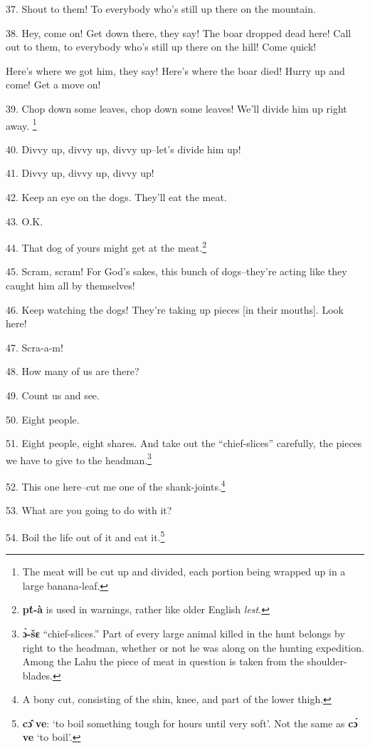 37. Shout to them! To everybody who's still up there on the mountain.

38. Hey, come on! Get down there, they say! The boar dropped dead here! Call out
to them, to everybody who's still up there on the hill! Come quick!

Here's where we got him, they say! Here's where the boar died! Hurry up and come!
Get a move on!

39. Chop down some leaves, chop down some leaves! We'll divide him up right away.
\footnote{The meat will be cut up and divided, each portion being wrapped up in a large banana-leaf.}

40. Divvy up, divvy up, divvy up--let's divide him up!

41. Divvy up, divvy up, divvy up!

42. Keep an eye on the dogs. They'll eat the meat.

43. O.K.


44. That dog of yours might get at the meat.\footnote{\textbf{pt́-à} is used in warnings, rather like older English \textit{lest}.}

45. Scram, scram! For God's sakes, this bunch of dogs--they're acting like they
caught him all by themselves!

46. Keep watching the dogs! They're taking up pieces [in their mouths]. Look here!

47. Scra-a-m!

48. How many of us are there?

49. Count us and see.

50. Eight people.

51. Eight people, eight shares. And take out the ``chief-slices''
carefully, the pieces we have to give to the headman.\footnote{\textbf{ɔ̀-šɛ} ``chief-slices.'' Part of every large animal killed in the hunt belongs by right to the headman, whether or not he was along on the hunting expedition. Among the Lahu the piece of meat in question is taken from the shoulder-blades.}

52. This one here--cut me one of the shank-joints.\footnote{A bony cut, consisting of the shin, knee, and part of the lower thigh.}

53. What are you going to do with it?

54. Boil the life out of it and eat it.\footnote{\textbf{cɔ̂} \textbf{ve}: `to boil something tough for hours until very soft'. Not the same as \textbf{cɔ́} \textbf{ve} `to boil'.}

